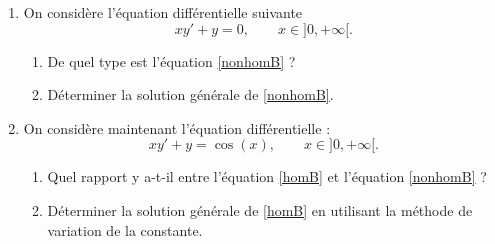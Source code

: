 
\begin{exercice}\label{exoanalyseCTU-0018}


\begin{enumerate}
\item  On considère l'équation différentielle suivante
  \begin{equation}\label{nonhomB}
    xy' + y = 0, \qquad x\in ]0, +\infty[.
  \end{equation}
  \begin{enumerate}
  \item De quel type est l'équation \eqref{nonhomB} ?
  \item Déterminer la solution générale de \eqref{nonhomB}.
  \end{enumerate}
 \item  On considère maintenant l'équation différentielle :
  \begin{equation}\label{homB}
    xy' + y = \cos(x), \qquad x\in ]0, +\infty[.
  \end{equation}
  \begin{enumerate}
  \item Quel rapport y a-t-il entre l'équation \eqref{homB} et  l'équation \eqref{nonhomB} ? 
  \item  Déterminer la solution générale de \eqref{homB} en utilisant la méthode de variation de la constante. 
  \end{enumerate}
\end{enumerate}


\end{exercice}
